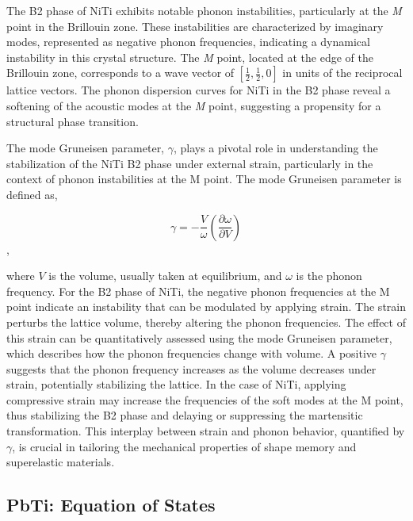 \documentclass[preprint]{elsarticle}
\begin{document}
The B2 phase of NiTi exhibits notable phonon instabilities, particularly at the \textit{M} point in the Brillouin zone. These instabilities are characterized by imaginary modes, represented as negative phonon frequencies, indicating a dynamical instability in this crystal structure. The \textit{M} point, located at the edge of the Brillouin zone, corresponds to a wave vector of $\left[\frac{1}{2}, \frac{1}{2}, 0\right]$ in units of the reciprocal lattice vectors. The phonon dispersion curves for NiTi in the B2 phase reveal a softening of the acoustic modes at the \textit{M} point, suggesting a propensity for a structural phase transition. \par

The mode Gruneisen parameter, $\gamma$, plays a pivotal role in understanding the stabilization of the NiTi B2 phase under external strain, particularly in the context of phonon instabilities at the M point. The mode Gruneisen parameter is defined as,

\begin{equation}
  \label{eq:modegruneisen}
  \gamma = -\frac{V}{\omega}\left(\frac{\partial \omega}{\partial V}\right)
\end{equation},

where $V$ is the volume, usually taken at equilibrium, and $\omega$ is the phonon frequency. For the B2 phase of NiTi, the negative phonon frequencies at the M point indicate an instability that can be modulated by applying strain. The strain perturbs the lattice volume, thereby altering the phonon frequencies. The effect of this strain can be quantitatively assessed using the mode Gruneisen parameter, which describes how the phonon frequencies change with volume. A positive $\gamma$ suggests that the phonon frequency increases as the volume decreases under strain, potentially stabilizing the lattice. In the case of NiTi, applying compressive strain may increase the frequencies of the soft modes at the M point, thus stabilizing the B2 phase and delaying or suppressing the martensitic transformation. This interplay between strain and phonon behavior, quantified by $\gamma$, is crucial in tailoring the mechanical properties of shape memory and superelastic materials.





\subsection{PbTi: Equation of States}
\end{document}
